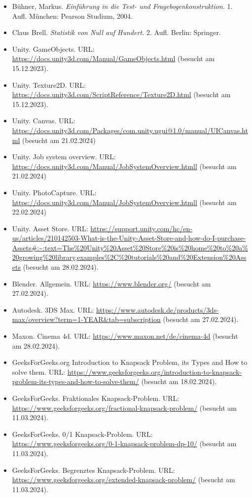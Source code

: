 \begin{itemize}
    \item Bühner, Markus. \textit{Einführung in die Test- und Fragebogenkonstruktion.} 1. Aufl. München: Pearson Studium, 2004.
    \item Claus Brell. \textit{Statistik von Null auf Hundert.} 2. Aufl. Berlin: Springer.
    \item Unity. GameObjects. URL: \url{https://docs.unity3d.com/Manual/GameObjects.html} (besucht am 15.12.2023).
    \item Unity. Texture2D. URL: \url{https://docs.unity3d.com/ScriptReference/Texture2D.html} (besucht am 15.12.2023).
    \item Unity. Canvas. URL: \url{https://docs.unity3d.com/Packages/com.unity.ugui@1.0/manual/UICanvas.html} (besucht am 21.02.2024)
    \item Unity. Job system overview. URL: \url{https://docs.unity3d.com/Manual/JobSystemOverview.htmll} (besucht am 21.02.2024)
    \item Unity. PhotoCapture. URL: \url{https://docs.unity3d.com/Manual/JobSystemOverview.htmll} (besucht am 22.02.2024)
    \item Unity. Asset Store. URL: \url{https://support.unity.com/hc/en-us/articles/210142503-What-is-the-Unity-Asset-Store-and-how-do-I-purchase-Assets#:~:text=The%20Unity%20Asset%20Store%20is%20home%20to%20a%20growing%20library,examples%2C%20tutorials%20and%20Extension%20Assets} (besucht am 28.02.2024).
    \item Blender. Allgemein. URL: \url{https://www.blender.org/} (besucht am 27.02.2024).
    \item Autodesk. 3DS Max. URL: \url{https://www.autodesk.de/products/3ds-max/overview?term=1-YEAR&tab=subscription} (besucht am 27.02.2024).
    \item Maxon. Cinema 4d. URL: \url{https://www.maxon.net/de/cinema-4d} (besucht am 28.02.2024).
    \item GeeksForGeeks.org Introduction to Knapsack Problem, its Types and How to solve them. URL: \url{https://www.geeksforgeeks.org/introduction-to-knapsack-problem-its-types-and-how-to-solve-them/} (besucht am 18.02.2024).
    \item GeeksForGeeks. Fraktionales Knapsack-Problem. URL: \url{https://www.geeksforgeeks.org/fractional-knapsack-problem/} (besucht am 11.03.2024).
    \item GeeksForGeeks. 0/1 Knapsack-Problem. URL: \url{https://www.geeksforgeeks.org/0-1-knapsack-problem-dp-10/} (besucht am 11.03.2024).
    \item GeeksForGeeks. Begrenztes Knapsack-Problem. URL: \url{https://www.geeksforgeeks.org/extended-knapsack-problem/} (besucht am 11.03.2024).

\end{itemize}
